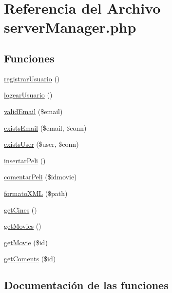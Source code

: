 \hypertarget{server_manager_8php}{}\section{Referencia del Archivo server\+Manager.\+php}
\label{server_manager_8php}
\subsection*{Funciones}
\begin{DoxyCompactItemize}
\item 
\mbox{\hyperlink{server_manager_8php_abeae2072dd7ffa5b78da10599eac6f57}{registrar\+Usuario}} ()
\item 
\mbox{\hyperlink{server_manager_8php_ab2dbd54cec9085bdf37669044a6400ea}{logear\+Usuario}} ()
\item 
\mbox{\hyperlink{server_manager_8php_a73637e760498c5cea55074896ec982ac}{valid\+Email}} (\$email)
\item 
\mbox{\hyperlink{server_manager_8php_ae11c1d4bc35a0e731d6c06d99ed1a48f}{exists\+Email}} (\$email, \$conn)
\item 
\mbox{\hyperlink{server_manager_8php_a51df6b16fb354abb57b1e2b7df901faf}{exists\+User}} (\$user, \$conn)
\item 
\mbox{\hyperlink{server_manager_8php_aea99533bc26bc9f13ff095ef792636ea}{insertar\+Peli}} ()
\item 
\mbox{\hyperlink{server_manager_8php_aa2f6bd89b72e28721df58798a8468d8e}{comentar\+Peli}} (\$idmovie)
\item 
\mbox{\hyperlink{server_manager_8php_ab4f3bf12b92f40682511b689e9844461}{formato\+X\+ML}} (\$path)
\item 
\mbox{\hyperlink{server_manager_8php_ac56532a15e25498ecfc3ce334217adb2}{get\+Cines}} ()
\item 
\mbox{\hyperlink{server_manager_8php_af16c238f2a71b7a08ff95871ae64c825}{get\+Movies}} ()
\item 
\mbox{\hyperlink{server_manager_8php_a7b9eed7e71146a4086047f9eaaf59985}{get\+Movie}} (\$id)
\item 
\mbox{\hyperlink{server_manager_8php_a165bd4fb886e760759845a26ed7d1c2f}{get\+Coments}} (\$id)
\end{DoxyCompactItemize}


\subsection{Documentación de las funciones}
\mbox{\label{server_manager_8php_aa2f6bd89b72e28721df58798a8468d8e}} 
